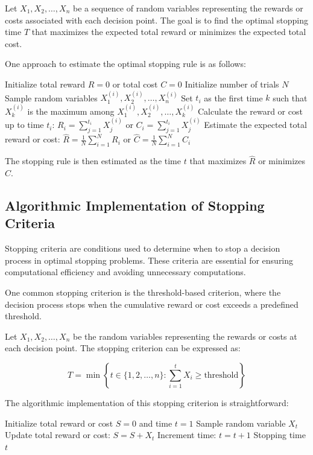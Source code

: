 \documentclass[12pt]{book} %
\begin{document}
Let \(X_1, X_2, \ldots, X_n\) be a sequence of random variables representing the rewards or costs associated with each decision point. The goal is to find the optimal stopping time \(T\) that maximizes the expected total reward or minimizes the expected total cost.

One approach to estimate the optimal stopping rule is as follows:

\begin{algorithm}
\caption{Monte Carlo Simulation for Estimating Stopping Rules}
\begin{algorithmic}[1]
\State Initialize total reward \(R = 0\) or total cost \(C = 0\)
\State Initialize number of trials \(N\)
    \State Sample random variables \(X_1^{(i)}, X_2^{(i)}, \ldots, X_n^{(i)}\)
    \State Set \(t_i\) as the first time \(k\) such that \(X_k^{(i)}\) is the maximum among \(X_1^{(i)}, X_2^{(i)}, \ldots, X_k^{(i)}\)
    \State Calculate the reward or cost up to time \(t_i\): \(R_i = \sum_{j=1}^{t_i} X_j^{(i)}\) or \(C_i = \sum_{j=1}^{t_i} X_j^{(i)}\)
\EndFor
\State Estimate the expected total reward or cost: \(\hat{R} = \frac{1}{N} \sum_{i=1}^{N} R_i\) or \(\hat{C} = \frac{1}{N} \sum_{i=1}^{N} C_i\)
\end{algorithmic}
\end{algorithm}
\FloatBarrier
The stopping rule is then estimated as the time \(t\) that maximizes \(\hat{R}\) or minimizes \(\hat{C}\).

\subsection{Algorithmic Implementation of Stopping Criteria}

Stopping criteria are conditions used to determine when to stop a decision process in optimal stopping problems. These criteria are essential for ensuring computational efficiency and avoiding unnecessary computations.

One common stopping criterion is the threshold-based criterion, where the decision process stops when the cumulative reward or cost exceeds a predefined threshold.

Let \(X_1, X_2, \ldots, X_n\) be the random variables representing the rewards or costs at each decision point. The stopping criterion can be expressed as:

\[
T = \min \left\{ t \in \{1, 2, \ldots, n\} : \sum_{i=1}^{t} X_i \geq \text{threshold} \right\}
\]

The algorithmic implementation of this stopping criterion is straightforward:
\FloatBarrier
\begin{algorithm}
\caption{Threshold-Based Stopping Criterion}
\begin{algorithmic}[1]
\State Initialize total reward or cost \(S = 0\) and time \(t = 1\)
    \State Sample random variable \(X_t\)
    \State Update total reward or cost: \(S = S + X_t\)
    \State Increment time: \(t = t + 1\)
\EndWhile
\Return Stopping time \(t\)
\end{algorithmic}
\end{algorithm}
\end{document}
